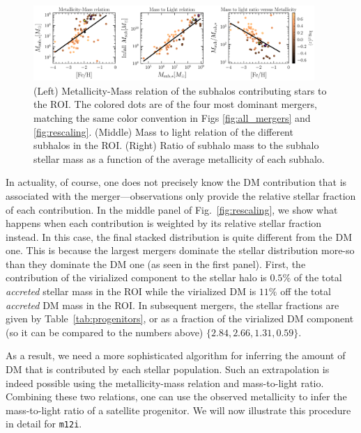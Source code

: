 \documentclass[twocolumn,preprintnumbers]{aastex6}
\DeclareRobustCommand{\Tab}[1]{Table~\ref{#1}}
\DeclareRobustCommand{\Fig}[1]{Fig.~\ref{#1}}
\newcommand{\mi}{\texttt{m12i}}
\begin{document}
\begin{figure}[tb] %
   \centering
	\includegraphics[width=0.95\textwidth]{plots/feh_infall_mass_ratios_all_subhalos_m12i.pdf}
   \caption{(Left) Metallicity-Mass relation of the subhalos contributing stars to the ROI. The colored dots are of the four most dominant mergers, matching the same color convention in Figs \ref{fig:all_mergers} and \ref{fig:rescaling}.  (Middle) Mass to light relation of the different subhalos in the ROI. (Right) Ratio of subhalo mass to the subhalo stellar mass as a function of the average metallicity of each subhalo.}
   \label{fig:scaling_relation}
\end{figure}


In actuality, of course, one does not precisely know the DM contribution that is associated with the merger---observations only provide the relative stellar fraction of each contribution.  In the middle panel of \Fig{fig:rescaling}, we show what happens when each contribution is weighted by its    
relative stellar fraction instead.  In this case, the final stacked distribution is quite different from the DM one.  This is because the largest mergers dominate the stellar distribution more-so than they dominate the DM one (as seen in the first panel). First, the contribution of the virialized component to the stellar halo is $0.5\%$ of the total \emph{accreted} stellar mass in the ROI while the virialized DM is $11 \%$ off the total \emph{accreted} DM mass in the ROI. In subsequent mergers, the stellar fractions are given by \Tab{tab:progenitors}, or as a fraction of the virialized DM component (so it can be compared to the numbers above) $\{ 2.84, 2.66, 1.31, 0.59 \}$.

As a result, we need a more sophisticated algorithm for inferring the amount of DM that is contributed by each stellar population.  Such an extrapolation is indeed possible using the metallicity-mass relation and mass-to-light ratio.  Combining these two relations, one can use the observed metallicity to infer the mass-to-light ratio of a satellite progenitor.   We will now illustrate this procedure in detail for \mi.  
\end{document}
